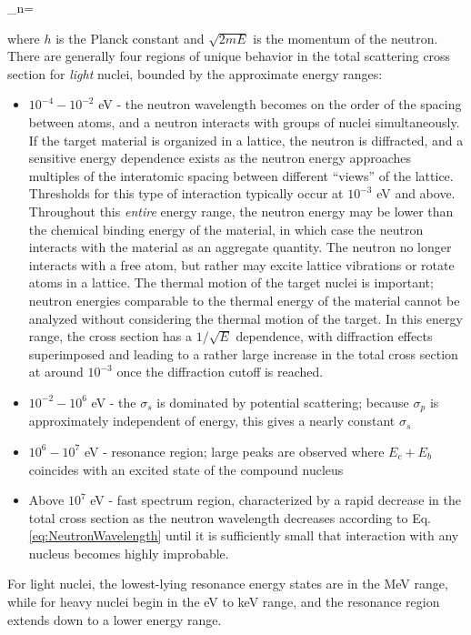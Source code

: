 \beq
\label{eq:NeutronWavelength}
\lambda_n=
\eeq

where \(h\) is the Planck constant and \(\sqrt{2mE}\) is the momentum of the neutron. There are generally four regions of unique behavior in the total scattering cross section for {\it light} nuclei, bounded by the approximate energy ranges:

\begin{itemize}
\item \(10^{-4}-10^{-2}\) eV - the neutron wavelength becomes on the order of the spacing between atoms, and a neutron interacts with groups of nuclei simultaneously. If the target material is organized in a lattice, the neutron is diffracted, and a sensitive energy dependence exists as the neutron energy approaches multiples of the interatomic spacing between different ``views'' of the lattice. Thresholds for this type of interaction typically occur at \(10^{-3}\) eV and above. Throughout this {\it entire} energy range, the neutron energy may be lower than the chemical binding energy of the material, in which case the neutron interacts with the material as an aggregate quantity. The neutron no longer interacts with a free atom, but rather may excite lattice vibrations or rotate atoms in a lattice. The thermal motion of the target nuclei is important; neutron energies comparable to the thermal energy of the material cannot be analyzed without considering the thermal motion of the target. In this energy range, the cross section has a \(1/\sqrt{E}\) dependence, with diffraction effects superimposed and leading to a rather large increase in the total cross section at around \(10^{-3}\) once the diffraction cutoff is reached.
\item \(10^{-2}-10^6\) eV - the \(\sigma_s\) is dominated by potential scattering; because \(\sigma_p\) is approximately independent of energy, this gives a nearly constant \(\sigma_s\) 
\item \(10^6-10^7\) eV - resonance region; large peaks are observed where \(E_c+E_b\) coincides with an excited state of the compound nucleus
\item Above \(10^7\) eV - fast spectrum region, characterized by a rapid decrease in the total cross section as the neutron wavelength decreases according to Eq. \eqref{eq:NeutronWavelength} until it is sufficiently small that interaction with any nucleus becomes highly improbable.
\end{itemize}

For light nuclei, the lowest-lying resonance energy states are in the MeV range, while for heavy nuclei begin in the eV to keV range, and the resonance region extends down to a lower energy range.

